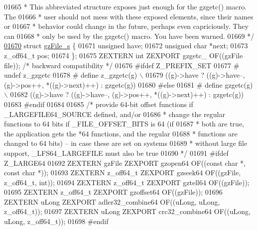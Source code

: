 \begin{DoxyCode}
01665 \textcolor{comment}{ * This abbreviated structure exposes just enough for the gzgetc() macro.  The}
01666 \textcolor{comment}{ * user should not mess with these exposed elements, since their names or}
01667 \textcolor{comment}{ * behavior could change in the future, perhaps even capriciously.  They can}
01668 \textcolor{comment}{ * only be used by the gzgetc() macro.  You have been warned.}
01669 \textcolor{comment}{ */}
\hyperlink{structgz_file__s}{01670} \textcolor{keyword}{struct }\hyperlink{structgz_file__s}{gzFile\_s} \{
01671     \textcolor{keywordtype}{unsigned} have;
01672     \textcolor{keywordtype}{unsigned} \textcolor{keywordtype}{char} *next;
01673     z\_off64\_t pos;
01674 \};
01675 ZEXTERN \textcolor{keywordtype}{int} ZEXPORT gzgetc\_ OF((gzFile file));  \textcolor{comment}{/* backward compatibility */}
01676 \textcolor{preprocessor}{#ifdef Z\_PREFIX\_SET}
01677 \textcolor{preprocessor}{#  undef z\_gzgetc}
01678 \textcolor{preprocessor}{#  define z\_gzgetc(g) \(\backslash\)}
01679 \textcolor{preprocessor}{          ((g)->have ? ((g)->have--, (g)->pos++, *((g)->next)++) : gzgetc(g))}
01680 \textcolor{preprocessor}{#else}
01681 \textcolor{preprocessor}{#  define gzgetc(g) \(\backslash\)}
01682 \textcolor{preprocessor}{          ((g)->have ? ((g)->have--, (g)->pos++, *((g)->next)++) : gzgetc(g))}
01683 \textcolor{preprocessor}{#endif}
01684 
01685 \textcolor{comment}{/* provide 64-bit offset functions if \_LARGEFILE64\_SOURCE defined, and/or}
01686 \textcolor{comment}{ * change the regular functions to 64 bits if \_FILE\_OFFSET\_BITS is 64 (if}
01687 \textcolor{comment}{ * both are true, the application gets the *64 functions, and the regular}
01688 \textcolor{comment}{ * functions are changed to 64 bits) -- in case these are set on systems}
01689 \textcolor{comment}{ * without large file support, \_LFS64\_LARGEFILE must also be true}
01690 \textcolor{comment}{ */}
01691 \textcolor{preprocessor}{#ifdef Z\_LARGE64}
01692    ZEXTERN gzFile ZEXPORT gzopen64 OF((\textcolor{keyword}{const} \textcolor{keywordtype}{char} *, \textcolor{keyword}{const} \textcolor{keywordtype}{char} *));
01693    ZEXTERN z\_off64\_t ZEXPORT gzseek64 OF((gzFile, z\_off64\_t, \textcolor{keywordtype}{int}));
01694    ZEXTERN z\_off64\_t ZEXPORT gztell64 OF((gzFile));
01695    ZEXTERN z\_off64\_t ZEXPORT gzoffset64 OF((gzFile));
01696    ZEXTERN uLong ZEXPORT adler32\_combine64 OF((uLong, uLong, z\_off64\_t));
01697    ZEXTERN uLong ZEXPORT crc32\_combine64 OF((uLong, uLong, z\_off64\_t));
01698 \textcolor{preprocessor}{#endif}

\end{DoxyCode}
